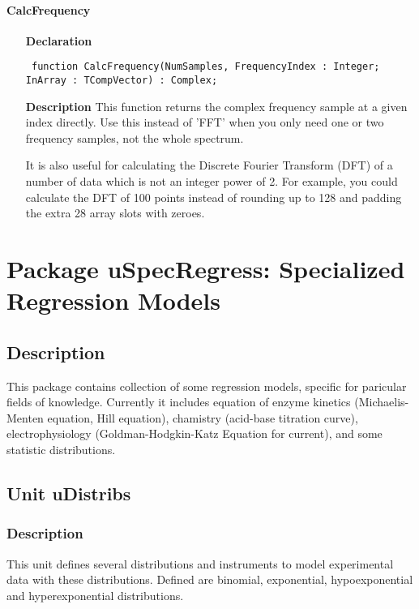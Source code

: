 \documentclass[12pt,a4paper,oneside]{report}
\newcommand{\lmath}[1]{   %
	\marginpar{\vspace{#1} 
		\begin{flushright}
			LMath
	\end{flushright} }
}
\newcommand{\declarationitem}[1]{\textbf{#1}}
\newcommand{\descriptiontitle}[1]{\textbf{#1}}
\newcommand{\code}[1]{\texttt{#1}}
\begin{document}
\subsubsection{CalcFrequency}
\label{ufft-CalcFrequency}
\begin{itemize}\item[\declarationitem{Declaration}\hfill]
	\begin{flushleft}
		\code{
			function CalcFrequency(NumSamples, FrequencyIndex : Integer; InArray : TCompVector) : Complex;}
		
	\end{flushleft}
	
	\par
	\item[\descriptiontitle{Description}]
	This function returns the complex frequency sample at a given index directly. Use this instead of 'FFT' when you only need one or two frequency samples, not the whole spectrum.
	
	It is also useful for calculating the Discrete Fourier Transform (DFT) of a number of data which is not an integer power of 2. For example, you could calculate the DFT of 100 points instead of rounding up to 128 and padding the extra 28 array slots with zeroes.
	
\end{itemize}
\chapter{Package uSpecRegress: Specialized Regression Models}\label{package-uspecregress}
\section{Description}
This package contains collection of some regression models, specific for paricular fields of knowledge. Currently it includes equation of enzyme kinetics (Michaelis-Menten equation, Hill equation), chamistry (acid-base titration curve), electrophysiology (Goldman-Hodgkin-Katz Equation for current), and some statistic distributions.
\section{Unit uDistribs}\lmath{-24pt}
\label{udistribs}
\subsection{Description}
This unit defines several distributions and instruments to model experimental data with these distributions. Defined are binomial, exponential, hypoexponential and hyperexponential distributions.
\end{document}
